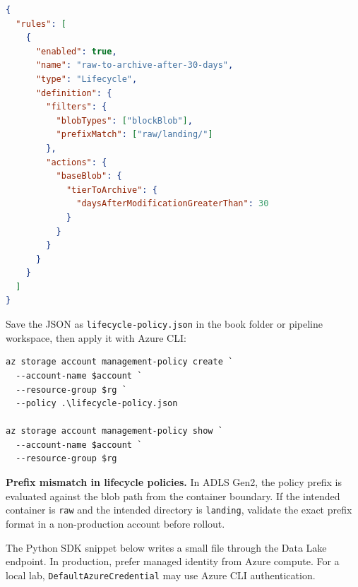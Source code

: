 \begin{lstlisting}[language=json,caption={Lifecycle policy that archives raw objects after 30 days.},label={lst:lifecycle-json}]
{
  "rules": [
    {
      "enabled": true,
      "name": "raw-to-archive-after-30-days",
      "type": "Lifecycle",
      "definition": {
        "filters": {
          "blobTypes": ["blockBlob"],
          "prefixMatch": ["raw/landing/"]
        },
        "actions": {
          "baseBlob": {
            "tierToArchive": {
              "daysAfterModificationGreaterThan": 30
            }
          }
        }
      }
    }
  ]
}
\end{lstlisting}

Save the JSON as \texttt{lifecycle-policy.json} in the book folder or pipeline workspace, then apply it with Azure CLI:

\begin{lstlisting}[language=AzureCLI,caption={Applying the lifecycle management policy.},label={lst:apply-lifecycle}]
az storage account management-policy create `
  --account-name $account `
  --resource-group $rg `
  --policy .\lifecycle-policy.json

az storage account management-policy show `
  --account-name $account `
  --resource-group $rg
\end{lstlisting}

\begin{pitfall}
\textbf{Prefix mismatch in lifecycle policies.} In ADLS Gen2, the policy prefix is evaluated against the blob path from the container boundary. If the intended container is \texttt{raw} and the intended directory is \texttt{landing}, validate the exact prefix format in a non-production account before rollout.
\end{pitfall}

The Python SDK snippet below writes a small file through the Data Lake endpoint. In production, prefer managed identity from Azure compute. For a local lab, \texttt{DefaultAzureCredential} may use Azure CLI authentication.

